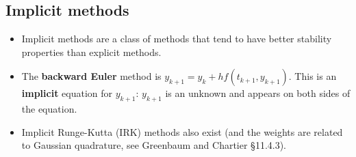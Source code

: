 \documentclass[12pt,letterpaper,noanswers]{exam}
\begin{document}
\subsection*{Implicit methods}
\begin{tcolorbox}
\begin{itemize}
\itemsep0pt
    \item Implicit methods are a class of methods that tend to have better stability properties than explicit methods.
    \item The \textbf{backward Euler} method is $y_{k+1} = y_k + hf(t_{k+1},y_{k+1})$.  This is an \textbf{implicit} equation for $y_{k+1}$: $y_{k+1}$ is an unknown and appears on both sides of the equation.
    \item Implicit Runge-Kutta (IRK) methods also exist (and the weights are related to Gaussian quadrature, see Greenbaum and Chartier \S 11.4.3).
\end{itemize}
\end{tcolorbox}
\end{document}
